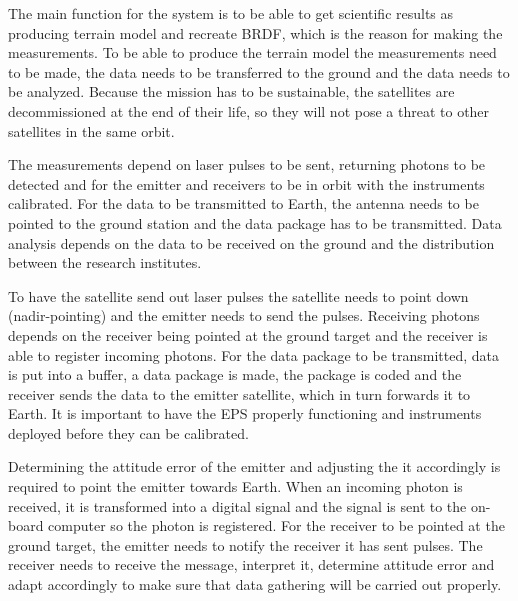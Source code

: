 The main function for the system is to be able to get scientific results as producing terrain model and recreate \acs{BRDF}, which is the reason for making the measurements. To be able to produce the terrain model the measurements need to be made, the data needs to be transferred to the ground and the data needs to be analyzed. Because the mission has to be sustainable, the satellites are decommissioned at the end of their life, so they will not pose a threat to other satellites in the same orbit.

The measurements depend on laser pulses to be sent, returning photons to be detected and for the emitter and receivers to be in orbit with the instruments calibrated. For the data to be transmitted to Earth, the antenna needs to be pointed to the ground station and the data package has to be transmitted. Data analysis depends on the data to be received on the ground and the distribution between the research institutes.

To have the satellite send out laser pulses the satellite needs to point down (nadir-pointing) and the emitter needs to send the pulses. Receiving photons depends on the receiver being pointed at the ground target and the receiver is able to register incoming photons. For the data package to be transmitted, data is put into a buffer, a data package is made, the package is coded and the receiver sends the data to the emitter satellite, which in turn forwards it to Earth. It is important to have the \ac{EPS} properly functioning and instruments deployed before they can be calibrated.

Determining the attitude error of the emitter and adjusting the it accordingly is required to point the emitter towards Earth. When an incoming photon is received, it is transformed into a digital signal and the signal is sent to the on-board computer so the photon is registered. For the receiver to be pointed at the ground target, the emitter needs to notify the receiver it has sent pulses. The receiver needs to receive the message, interpret it, determine attitude error and adapt accordingly to make sure that data gathering will be carried out properly. 

